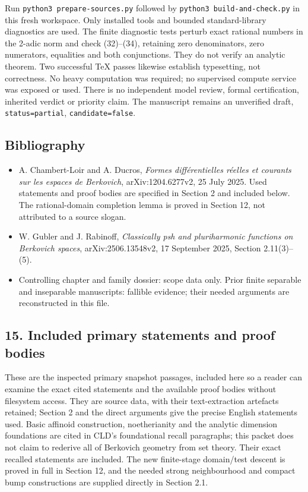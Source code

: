 \documentclass[
  11pt,
]{article}
\newcommand{\passthrough}[1]{#1}
\providecommand{\tightlist}{%
  \setlength{\itemsep}{0pt}\setlength{\parskip}{0pt}}
\begin{document}
Run \passthrough{\lstinline!python3 prepare-sources.py!} followed by
\passthrough{\lstinline!python3 build-and-check.py!} in this fresh
workspace. Only installed tools and bounded standard-library diagnostics
are used. The finite diagnostic tests perturb exact rational numbers in
the 2-adic norm and check (32)--(34), retaining zero denominators, zero
numerators, equalities and both conjunctions. They do not verify an
analytic theorem. Two successful TeX passes likewise establish
typesetting, not correctness. No heavy computation was required; no
supervised compute service was exposed or used. There is no independent
model review, formal certification, inherited verdict or priority claim.
The manuscript remains an unverified draft,
\passthrough{\lstinline!status=partial!},
\passthrough{\lstinline!candidate=false!}.

\subsection{Bibliography}\label{bibliography}

\begin{itemize}
\tightlist
\item
  A. Chambert-Loir and A. Ducros, \emph{Formes différentielles réelles
  et courants sur les espaces de Berkovich}, arXiv:1204.6277v2, 25 July
  2025. Used statements and proof bodies are specified in Section 2 and
  included below. The rational-domain completion lemma is proved in
  Section 12, not attributed to a source slogan.
\item
  W. Gubler and J. Rabinoff, \emph{Classically psh and pluriharmonic
  functions on Berkovich spaces}, arXiv:2506.13548v2, 17 September 2025,
  Section 2.11(3)--(5).
\item
  Controlling chapter and family dossier: scope data only. Prior finite
  separable and inseparable manuscripts: fallible evidence; their needed
  arguments are reconstructed in this file.
\end{itemize}

\subsection{15. Included primary statements and proof
bodies}\label{included-primary-statements-and-proof-bodies}

These are the inspected primary snapshot passages, included here so a
reader can examine the exact cited statements and the available proof
bodies without filesystem access. They are source data, with their
text-extraction artefacts retained; Section 2 and the direct arguments
give the precise English statements used. Basic affinoid construction,
noetherianity and the analytic dimension foundations are cited in CLD's
foundational recall paragraphs; this packet does not claim to rederive
all of Berkovich geometry from set theory. Their exact recalled
statements are included. The new finite-stage domain/test descent is
proved in full in Section 12, and the needed strong neighbourhood and
compact bump constructions are supplied directly in Section 2.1.
\end{document}
